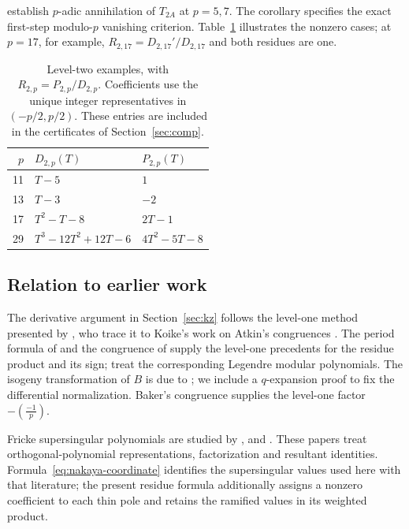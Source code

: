 \documentclass[11pt,a4paper]{article}
\numberwithin{equation}{section}
\theoremstyle{definition}
\theoremstyle{remark}
\begin{document}
\citet[Lemma~4.8 and Table~4.3]{CMT19} establish $p$-adic
annihilation of $T_{2A}$ at $p=5,7$. The corollary specifies the exact
first-step modulo-$p$ vanishing criterion. Table~\ref{tab:leveltwo-examples}
illustrates the nonzero cases; at $p=17$, for example,
$R_{2,17}=D_{2,17}'/D_{2,17}$ and both residues are one.

\begin{table}[htbp]\centering
\begin{tabular}{rll}\toprule
$p$ & $D_{2,p}(T)$ & $P_{2,p}(T)$\\\midrule
11 & $T-5$ & $1$\\
13 & $T-3$ & $-2$\\
17 & $T^2-T-8$ & $2T-1$\\
29 & $T^3-12T^2+12T-6$ & $4T^2-5T-8$\\\bottomrule
\end{tabular}
\caption{Level-two examples, with $R_{2,p}=P_{2,p}/D_{2,p}$.
Coefficients use the unique integer representatives in $(-p/2,p/2)$.
These entries are included in the certificates of Section~\ref{sec:comp}.}
\label{tab:leveltwo-examples}
\end{table}

\subsection{Relation to earlier work}
The derivative argument in Section~\ref{sec:kz} follows the level-one method
presented by \citet[\S10]{KZ98}, who trace it to Koike's work
on Atkin's congruences \citep{Koike73}. The period formula of \citet{dS94}
and the congruence of \citet{Baker98} supply the level-one precedents for the
residue product and its sign; \citet{BL18} treat the corresponding Legendre
modular polynomials. The isogeny transformation of $B$ is due to
\citet[Th\'eor\`eme B, p.~106; \S3.3, Lemma~7 and (19), p.~124]{Robert80};
we include a $q$-expansion proof to fix the differential normalization.
Baker's congruence supplies the level-one factor $-\left(\frac{-1}{p}\right)$.

Fricke supersingular polynomials are studied by \citet{Sakai11,Sakai14},
\citet{Nakaya19} and \citet{Morton23}. These papers treat
orthogonal-polynomial representations, factorization and resultant
identities. Formula~\eqref{eq:nakaya-coordinate} identifies the supersingular
values used here with that literature; the present residue formula additionally
assigns a nonzero coefficient to each thin pole and retains the ramified values
in its weighted product.
\end{document}
